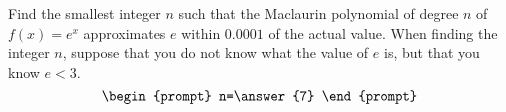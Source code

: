 \documentclass{ximera}
\author{Gregory Hartman \and Matthew Carr}
\begin{document}
\begin{exercise}





Find the smallest integer $n$ such that the Maclaurin polynomial of degree $n$ of $f(x)=e^x$ approximates $e$ within $0.0001$ of the actual value. When finding the integer $n$, suppose that you do not know what the value of $e$ is, but that you know $e<3$.
\[
\begin{prompt}
n=\answer{7}
\end{prompt}
\]

\end{exercise}
\end{document}
